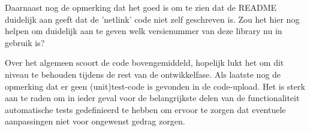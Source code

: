 	Daarnaast nog de opmerking dat het goed is om te zien dat de README duidelijk aan geeft dat de 'netlink' code niet zelf geschreven is. Zou het hier nog helpen om duidelijk aan te geven welk versienummer van deze library nu in gebruik is?

	Over het algemeen scoort de code bovengemiddeld, hopelijk lukt het om dit niveau te behouden tijdens de rest van de ontwikkelfase. Als laatste nog de opmerking dat er geen (unit)test-code is gevonden in de code-upload. Het is sterk aan te raden om in ieder geval voor de belangrijkste delen van de functionaliteit automatische tests gedefinieerd te hebben om ervoor te zorgen dat eventuele aanpassingen niet voor ongewenst gedrag zorgen. 